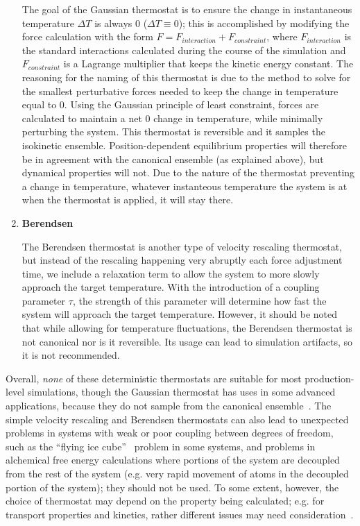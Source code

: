 \documentclass[9pt,bestpractices]{livecoms}
\begin{document}
\begin{enumerate}[listparindent=\parindent]
        The goal of the Gaussian thermostat is to ensure the change in instantaneous temperature $\Delta T$ is always 0 ($\Delta T \equiv 0$); this is accomplished by modifying the force calculation with the form $F = F_{interaction} + F_{constraint}$, where $F_{interaction}$ is the standard interactions calculated during the course of the simulation and $F_{constraint}$ is a Lagrange multiplier that keeps the kinetic energy constant.
        The reasoning for the naming of this thermostat is due to the method to solve for the smallest perturbative forces needed to keep the change in temperature equal to 0.
        Using the Gaussian principle of least constraint, forces are calculated to maintain a net 0 change in temperature, while minimally perturbing the system\cite{thermostatAlgorithms2005}.
        This thermostat is reversible and it samples the isokinetic ensemble.
        Position-dependent equilibrium properties will therefore be in agreement with the canonical ensemble (as explained above), but dynamical properties will not.
        Due to the nature of the thermostat preventing a change in temperature, whatever instanteous temperature the system is at when the thermostat is applied, it will stay there. 

    \item \textbf{Berendsen}

        The Berendsen thermostat is another type of velocity rescaling thermostat, but instead of the rescaling happening very abruptly each force adjustment time, we include a relaxation term to allow the system to more slowly approach the target temperature\cite{berendsen1984molecular}.
        With the introduction of a coupling parameter $\tau$, the strength of this parameter will determine how fast the system will approach the target temperature.
        However, it should be noted that while allowing for temperature fluctuations, the Berendsen thermostat is not canonical nor is it reversible.
        Its usage can lead to simulation artifacts, so it is not recommended\cite{2018Braun}.

\end{enumerate}

Overall, \emph{none} of these deterministic thermostats are suitable for most production-level simulations, though the Gaussian thermostat has uses in some advanced applications\cite{Minary:2002:JChemPhysAlgorithms}, because they do not sample from the canonical ensemble~\cite{Shirts:2013:J.Chem.TheoryComput.}.
The simple velocity rescaling and Berendsen thermostats can also lead to unexpected problems in systems with weak or poor coupling between degrees of freedom, such as the ``flying ice cube''~\cite{Harvey:1998:JCompChem} problem in some systems, and problems in alchemical free energy calculations where portions of the system are decoupled from the rest of the system (e.g. very rapid movement of atoms in the decoupled portion of the system); they should not be used.
To some extent, however, the choice of thermostat may depend on the property being calculated; e.g. for transport properties and kinetics, rather different issues may need consideration~\cite{Basconi:2013:J.Chem.TheoryComput.}.
\end{document}
